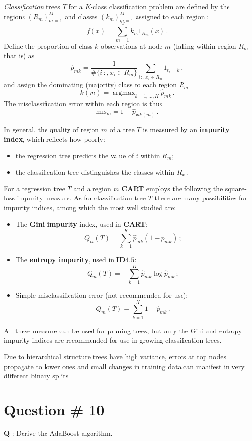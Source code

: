 \documentclass[a4paper]{article}
\newcommand{\argmax}{\mathop{\text{argmax}}}
\begin{document}
\emph{Classification} trees $T$ for a $K$-class classification problem are defined
by the regions $(R_m)_{m=1}^M$ and classes $(k_m)_{m=1}^M$ assigned to each region :
\[ f(x) = \sum_{m=1}^M k_m 1_{R_m}(x) \,. \]
Define the proportion of class $k$ observations at node $m$ (falling within region
$R_m$ that is) as
\[ \hat{p}_{mk} = \frac{1}{\#\{i\,:,x_i\in R_m\}} \sum_{i\,:,x_i\in R_m} 1_{t_i = k} \,, \]
and assign the dominating (majority) class to each region $R_m$ 
\[ k(m) = \argmax_{k=1,\ldots,K} \hat{p}_{mk} \,. \]
The misclassification error within each region is thus
\[ \text{mis}_m = 1 - \hat{p}_{m k(m)}\,. \]

In general, the quality of region $m$ of a tree $T$ is measured by an \textbf{impurity
index}, which reflects how poorly:
\begin{itemize}
	\item the regression tree predicts the value of $t$ within $R_m$;
	\item the classification tree distinguishes the classes within $R_m$.
\end{itemize}
For a regression tree $T$ and a region $m$ \textbf{CART} employs the following
the square-loss impurity measure. As for classification tree $T$ there are many
possibilities for impurity indices, among which the most well studied are:
\begin{itemize}
	\item The \textbf{Gini impurity} index, used in \textbf{CART}:
	\[ Q_m(T) = \sum_{k=1}^K \hat{p}_{mk} (1-\hat{p}_{mk}) \,; \]
	\item The \textbf{entropy impurity}, used in \textbf{ID$4.5$}:
	\[ Q_m(T) = - \sum_{k=1}^K \hat{p}_{mk} \log \hat{p}_{mk} \,; \]
	\item Simple misclassification error (not recommended for use):
	\[ Q_m(T) = \sum_{k=1}^K 1-\hat{p}_{mk} \,.\]
\end{itemize}
All these measure can be used for pruning trees, but only the Gini and entropy
impurity indices are recommended for use in growing classification trees.

Due to hierarchical structure trees have high variance, errors at top nodes propagate
to lower ones and small changes in training data can manifest in very different binary
splits.

\clearpage

\section[AdaBoost]{Question \# 10} %
\label{sec:question_10}
\textbf{\large \textbf{Q}} : Derive the AdaBoost algorithm.
\end{document}
